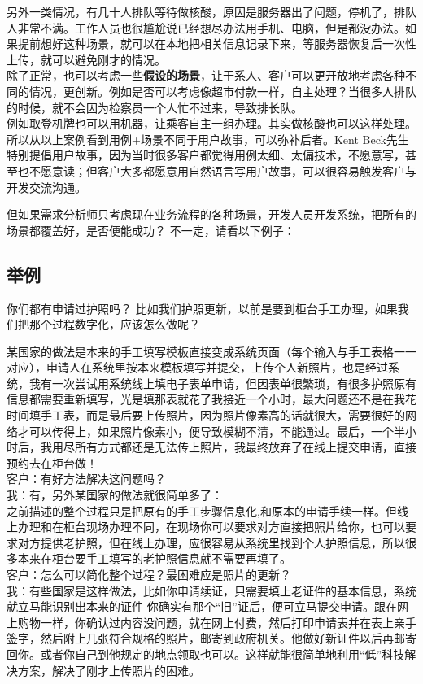 另外一类情况，有几十人排队等待做核酸，原因是服务器出了问题，停机了，排队人非常不满。工作人员也很尴尬说已经想尽办法用手机、电脑，但是都没办法。如果提前想好这种场景，就可以在本地把相关信息记录下来，等服务器恢复后一次性上传，就可以避免刚才的情况。\\
除了正常，也可以考虑一些\textbf{假设的场景}，让干系人、客户可以更开放地考虑各种不同的情况，更创新。例如是否可以考虑像超市付款一样，自主处理？当很多人排队的时候，就不会因为检察员一个人忙不过来，导致排长队。\\
例如取登机牌也可以用机器，让乘客自主一组办理。其实做核酸也可以这样处理。\\
所以从以上案例看到用例+场景不同于用户故事，可以弥补后者。Kent
Beck先生特别提倡用户故事，因为当时很多客户都觉得用例太细、太偏技术，不愿意写，甚至也不愿意读；但客户大多都愿意用自然语言写用户故事，可以很容易触发客户与开发交流沟通。

但如果需求分析师只考虑现在业务流程的各种场景，开发人员开发系统，把所有的场景都覆盖好，是否便能成功？
不一定，请看以下例子：

\hypertarget{ux4e3eux4f8b}{%
\subsection{举例}\label{ux4e3eux4f8b}}

你们都有申请过护照吗？
比如我们护照更新，以前是要到柜台手工办理，如果我们把那个过程数字化，应该怎么做呢？

某国家的做法是本来的手工填写模板直接变成系统页面（每个输入与手工表格一一对应），申请人在系统里按本来模板填写并提交，上传个人新照片，也是经过系统，我有一次尝试用系统线上填电子表单申请，但因表单很繁琐，有很多护照原有信息都需要重新填写，光是填那表就花了我接近一个小时，最大问题还不是在我花时间填手工表，而是最后要上传照片，因为照片像素高的话就很大，需要很好的网络才可以传得上，如果照片像素小，便导致模糊不清，不能通过。最后，一个半小时后，我用尽所有方式都还是无法传上照片，我最终放弃了在线上提交申请，直接预约去在柜台做！\\
客户：有好方法解决这问题吗？\\
我：有，另外某国家的做法就很简单多了：\\
之前描述的整个过程只是把原有的手工步骤信息化,和原本的申请手续一样。但线上办理和在柜台现场办理不同，在现场你可以要求对方直接把照片给你，也可以要求对方提供老护照，但在线上办理，应很容易从系统里找到个人护照信息，所以很多本来在柜台要手工填写的老护照信息就不需要再填了。\\
客户：怎么可以简化整个过程？最困难应是照片的更新？\\
我：有些国家是这样做法，比如你申请续证，只需要填上老证件的基本信息，系统就立马能识别出本来的证件
你确实有那个``旧''证后，便可立马提交申请。跟在网上购物一样，你确认过内容没问题，就在网上付费，然后打印申请表并在表上亲手签字，然后附上几张符合规格的照片，邮寄到政府机关。他做好新证件以后再邮寄回你。或者你自己到他规定的地点领取也可以。这样就能很简单地利用``低''科技解决方案，解决了刚才上传照片的困难。

